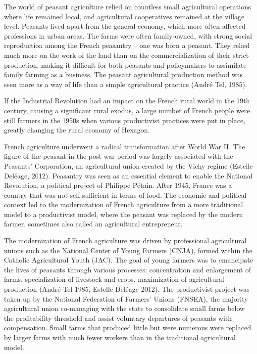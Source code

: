 \documentclass[12pt]{article}
\begin{document}
The world of peasant agriculture relied on countless small agricultural operations where life remained local, and agricultural cooperatives remained at the village level. Peasants lived apart from the general economy, which more often affected professions in urban areas. The farms were often family-owned, with strong social reproduction among the French peasantry – one was born a peasant. They relied much more on the work of the land than on the commercialization of their strict production, making it difficult for both peasants and policymakers to assimilate family farming as a business. The peasant agricultural production method was seen more as a way of life than a simple agricultural practice (André Tel, 1985).

If the Industrial Revolution had an impact on the French rural world in the 19th century, causing a significant rural exodus, a large number of French people were still farmers in the 1950s when various productivist practices were put in place, greatly changing the rural economy of Hexagon.

French agriculture underwent a radical transformation after World War II. The figure of the peasant in the post-war period was largely associated with the Peasants' Corporation, an agricultural union created by the Vichy regime (Estelle Deléage, 2012). Peasantry was seen as an essential element to enable the National Revolution, a political project of Philippe Pétain. After 1945, France was a country that was not self-sufficient in terms of food. The economic and political context led to the modernization of French agriculture from a more traditional model to a productivist model, where the peasant was replaced by the modern farmer, sometimes also called an agricultural entrepreneur.

The modernization of French agriculture was driven by professional agricultural unions such as the National Center of Young Farmers (CNJA), formed within the Catholic Agricultural Youth (JAC). The goal of young farmers was to emancipate the lives of peasants through various processes: concentration and enlargement of farms, specialization of livestock and crops, maximization of agricultural production (André Tel 1985, Estelle Deléage 2012). The productivist project was taken up by the National Federation of Farmers' Unions (FNSEA), the majority agricultural union co-managing with the state to consolidate small farms below the profitability threshold and assist voluntary departures of peasants with compensation. Small farms that produced little but were numerous were replaced by larger farms with much fewer workers than in the traditional agricultural model.
\end{document}
